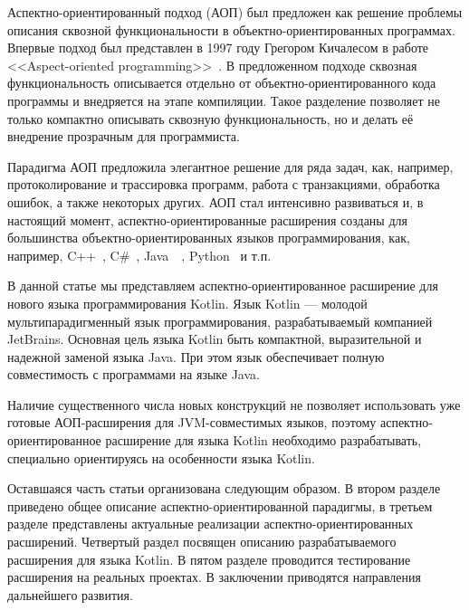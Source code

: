 \documentclass[conference]{IEEEtran}
\begin{document}
Аспектно-ориентированный подход (АОП) был предложен как решение проблемы
описания сквозной функциональности в объектно-ориентированных программах.
Впервые подход был представлен в 1997 году Грегором Кичалесом в работе
<<Aspect-oriented programming>>~\cite{kiczales_aop}.
В предложенном подходе сквозная функциональность описывается отдельно от
объектно-ориентированного кода программы и внедряется на этапе компиляции.
Такое разделение позволяет не только компактно описывать сквозную 
функциональность, но и делать её внедрение прозрачным для программиста.

Парадигма АОП предложила элегантное решение для ряда задач, как, например, 
протоколирование и трассировка программ, работа с транзакциями, обработка
ошибок, а также некоторых других.
АОП стал интенсивно развиваться и, в настоящий момент, аспектно-ориентированные
расширения созданы для большинства объектно-ориентированных языков
программирования, как, например, C++~\cite{aspectC_homepage},
C\#~\cite{postsharp_doc}, Java~\cite{aspectj_doc}~\cite{springAOP_doc},
Python~\cite{spring_python} и т.п.

В данной статье мы представляем аспектно-ориентированное расширение для нового 
языка программирования Kotlin.
Язык Kotlin --- молодой мультипарадигменный язык программирования,
разрабатываемый компанией JetBrains.
Основная цель языка Kotlin быть компактной, выразительной и надежной заменой
языка Java.
При этом язык обеспечивает полную совместимость с программами на языке
Java.

Наличие существенного числа новых конструкций не позволяет использовать уже 
готовые АОП-расширения для JVM-совместимых языков, поэтому
аспектно-ориентированное  расширение для языка Kotlin необходимо разрабатывать,
специально ориентируясь на особенности языка Kotlin. 

Оставшаяся часть статьи организована следующим образом. 
В втором разделе приведено общее описание аспектно-ориентированной парадигмы, 
в третьем разделе представлены актуальные реализации аспектно-ориентированных 
расширений.
Четвертый раздел посвящен описанию разрабатываемого расширения для языка Kotlin.
В пятом разделе проводится тестирование расширения на реальных проектах.
В заключении приводятся направления дальнейшего развития. 

\end{document}
